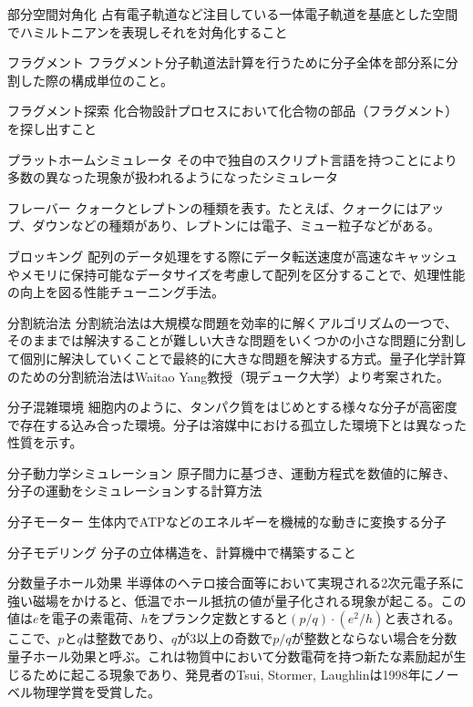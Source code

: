 \begin{用語集}
\item{部分空間対角化}{}
{占有電子軌道など注目している一体電子軌道を基底とした空間でハミルトニアンを表現しそれを対角化すること}
\item{フラグメント}{}
{フラグメント分子軌道法計算を行うために分子全体を部分系に分割した際の構成単位のこと。}
\item{フラグメント探索}{}
{化合物設計プロセスにおいて化合物の部品（フラグメント）を探し出すこと}
\item{プラットホームシミュレータ}{}
{その中で独自のスクリプト言語を持つことにより多数の異なった現象が扱われるようになったシミュレータ}
\item{フレーバー}{}
{クォークとレプトンの種類を表す。たとえば、クォークにはアップ、ダウンなどの種類があり、レプトンには電子、ミュー粒子などがある。}
\item{ブロッキング}{}
{配列のデータ処理をする際にデータ転送速度が高速なキャッシュやメモリに保持可能なデータサイズを考慮して配列を区分することで、処理性能の向上を図る性能チューニング手法。}
\item{分割統治法}{}
{分割統治法は大規模な問題を効率的に解くアルゴリズムの一つで、そのままでは解決することが難しい大きな問題をいくつかの小さな問題に分割して個別に解決していくことで最終的に大きな問題を解決する方式。量子化学計算のための分割統治法はWaitao Yang教授（現デューク大学）より考案された。}
\item{分子混雑環境}{}
{細胞内のように、タンパク質をはじめとする様々な分子が高密度で存在する込み合った環境。分子は溶媒中における孤立した環境下とは異なった性質を示す。}
\item{分子動力学シミュレーション}{}
{原子間力に基づき、運動方程式を数値的に解き、分子の運動をシミュレーションする計算方法}
\item{分子モーター}{}
{生体内でATPなどのエネルギーを機械的な動きに変換する分子}
\item{分子モデリング}{}
{分子の立体構造を、計算機中で構築すること}
\item{分数量子ホール効果}{}
{半導体のヘテロ接合面等において実現される2次元電子系に強い磁場をかけると、低温でホール抵抗の値が量子化される現象が起こる。この値は$e$を電子の素電荷、$h$をプランク定数とすると$(p/q)\cdot(e^2/h)$と表される。ここで、$p$と$q$は整数であり、$q$が3以上の奇数で$p/q$が整数とならない場合を分数量子ホール効果と呼ぶ。これは物質中において分数電荷を持つ新たな素励起が生じるために起こる現象であり、発見者のTsui, Stormer, Laughlinは1998年にノーベル物理学賞を受賞した。}

\end{用語集}
